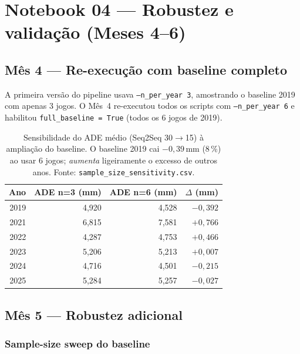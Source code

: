 \documentclass[11pt,a4paper]{article}
\begin{document}
\section{Notebook 04 --- Robustez e valida\c{c}\~ao (Meses 4--6)}

\subsection{M\^es 4 --- Re-execu\c{c}\~ao com baseline completo}

A primeira vers\~ao do pipeline usava \texttt{--n\_per\_year 3},
amostrando o baseline 2019 com apenas 3 jogos. O M\^es~4 re-executou
todos os scripts com \texttt{--n\_per\_year 6} e habilitou
\texttt{full\_baseline = True} (todos os 6 jogos de 2019).

\begin{table}[H]
\centering\small
\begin{tabular}{r r r r}
\toprule
\textbf{Ano} & \textbf{ADE \scriptsize{n=3} (mm)} & \textbf{ADE \scriptsize{n=6} (mm)} & $\Delta$ \textbf{(mm)} \\
\midrule
2019 & 4{,}920 & 4{,}528 & $-0{,}392$ \\
2021 & 6{,}815 & 7{,}581 & $+0{,}766$ \\
2022 & 4{,}287 & 4{,}753 & $+0{,}466$ \\
2023 & 5{,}206 & 5{,}213 & $+0{,}007$ \\
2024 & 4{,}716 & 4{,}501 & $-0{,}215$ \\
2025 & 5{,}284 & 5{,}257 & $-0{,}027$ \\
\bottomrule
\end{tabular}
\caption{Sensibilidade do ADE m\'edio (Seq2Seq 30$\to$15) \`a amplia\c{c}\~ao
         do baseline. O baseline 2019 cai $-0{,}39$\,mm (8\,\%) ao usar
         6 jogos; \emph{aumenta} ligeiramente o excesso de outros
         anos. Fonte: \texttt{sample\_size\_sensitivity.csv}.}
\label{tab:sensitivity}
\end{table}

\subsection{M\^es 5 --- Robustez adicional}

\subsubsection{Sample-size sweep do baseline}
\end{document}
